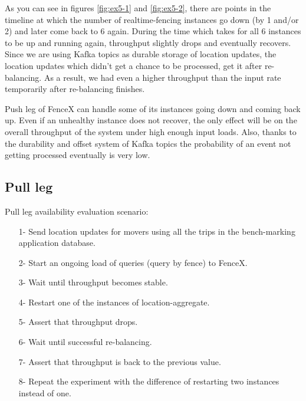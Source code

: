 \documentclass[a4]{report}
\begin{document}
    As you can see in figures \ref{fig:ex5-1} and \ref{fig:ex5-2}, there are points in the timeline at which the number of
    realtime-fencing instances go down (by 1 and/or 2) and later come back to 6 again.
    During the time which takes for all 6 instances to be up and running again, throughput slightly drops and
    eventually recovers.
    Since we are using Kafka topics as durable storage of location updates, the location updates which
    didn't get a chance to be processed, get it after re-balancing.
    As a result, we had even a higher throughput than the input rate temporarily after re-balancing finishes.

    Push leg of FenceX can handle some of its instances going down and coming back up.
    Even if an unhealthy instance does not recover, the only effect will be on the overall throughput of the system under high enough input loads.
    Also, thanks to the durability and offset system of Kafka topics the probability of an event not getting processed
    eventually is very low.

    \clearpage

    \subsection{Pull leg}
    Pull leg availability evaluation scenario:
    \begin{itemize}
        \item[1-] Send location updates for movers using all the trips in the bench-marking application database.
        \item[2-] Start an ongoing load of queries (query by fence) to FenceX.
        \item[3-] Wait until throughput becomes stable.
        \item[4-] Restart one of the instances of location-aggregate.
        \item[5-] Assert that throughput drops.
        \item[6-] Wait until successful re-balancing.
        \item[7-] Assert that throughput is back to the previous value.
        \item[8-] Repeat the experiment with the difference of restarting two instances instead of one.
    \end{itemize}
\end{document}
